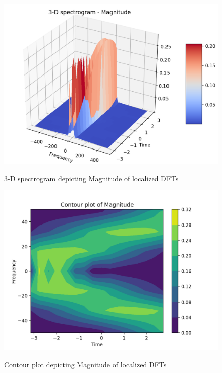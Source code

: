 \documentclass[11pt, a4paper]{article}
\begin{document}
\begin{figure}[H]
   	\centering
   	\includegraphics[scale=0.5]{qn6_mag.png}
   	\label{fig:qn6_mag}
   	\caption{3-D spectrogram depicting Magnitude of localized DFTs}
\end{figure}
\begin{figure}[H]
   	\centering
   	\includegraphics[scale=0.5]{qn6_cont.png}
   	\label{fig:qn6_cont}
   	\caption{Contour plot depicting Magnitude of localized DFTs}
\end{figure}
\end{document}
